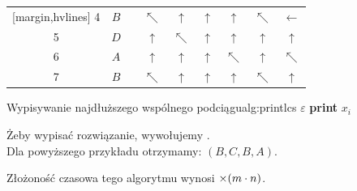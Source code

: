 \begin{table}[H]
\begin{minipage}{0.48\linewidth}
\begin{NiceTabular}{cc|c|cccccc}[margin,hvlines]
			4   & $B$   &       & $\nwarrow$ & $\uparrow$   & $\uparrow$   & $\uparrow$   & $\nwarrow$   & $\leftarrow$ \\
			5   & $D$   &       & $\uparrow$ & $\nwarrow$   & $\uparrow$   & $\uparrow$   & $\uparrow$   & $\uparrow$   \\
			6   & $A$   &       & $\uparrow$ & $\uparrow$   & $\uparrow$   & $\nwarrow$   & $\uparrow$   & $\nwarrow$   \\
			7   & $B$   &       & $\nwarrow$ & $\uparrow$   & $\uparrow$   & $\uparrow$   & $\nwarrow$   & $\uparrow$   \\
		\end{NiceTabular}
	\end{minipage}
\end{table}

\begin{alg}{Wypisywanie najdłuższego wspólnego podciągu}{alg:printlcs}
	\State \Return $\varepsilon$ 
	\EndIf
	\State {}
	\State \textbf{print} $x_i$
	\State {}
	\Else
	\State {}
	\EndIf
	\EndFunction
\end{alg}

Żeby wypisać rozwiązanie, wywołujemy . \\
Dla powyższego przykładu otrzymamy: $(B, C, B, A)$.

Złożoność czasowa tego algorytmu wynosi $\mathcal{\Theta}(m \cdot n)$.
